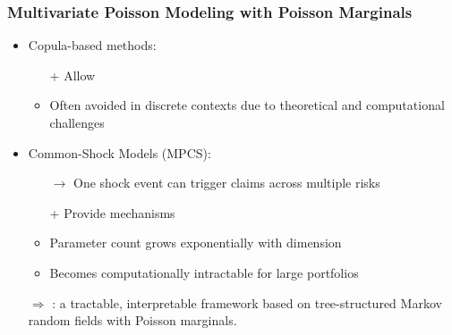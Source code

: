 \documentclass[11pt,xcolor={dvipsnames},hyperref={pdftex,pdfpagemode=UseNone,hidelinks,pdfdisplaydoctitle=true},usepdftitle=false]{beamer}
\begin{document}
\begin{frame}
\frametitle{Multivariate Poisson Modeling with Poisson Marginals}
\begin{itemize}
        \item Copula-based methods:
        \begin{itemize}
            \item[+] Allow 
            \item Often avoided in discrete contexts due to theoretical and computational challenges\\
            \citep{genest2007primer, henn2022limitations}
        \end{itemize}
        
        \vfill
        \pause
        \item Common-Shock Models (MPCS):
        \begin{itemize}
        \item[$\rightarrow$] One shock event can trigger claims across multiple risks
        \item[+] Provide  mechanisms
            \item Parameter count grows exponentially with dimension
            \item Becomes computationally intractable for large portfolios\\
            \tiny \citep{karlis2003algorithm, ccekyay2023computing}
        \end{itemize}
        \vfill 
        \item[$\Rightarrow$]  \cite{cote2025tree}: a tractable, interpretable framework based on tree-structured Markov random fields with Poisson marginals.
\end{itemize}
\end{frame} 
\end{document}

